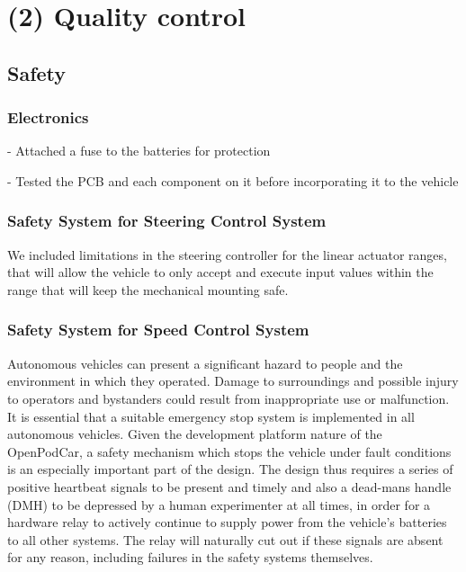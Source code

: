\documentclass[a4paper]{article}
\begin{document}
\section{(2) Quality control}\label{h.f8237gmzmwc6}

\subsection{Safety}\label{h.v60aduckfisj}


\subsubsection{Electronics}

- Attached a fuse to the batteries for protection

- Tested the PCB and each component on it before incorporating it to the vehicle


\subsubsection{Safety System for Steering Control System}

We included limitations in the steering controller for the linear actuator ranges, that will allow the vehicle to only accept and execute input values within the range that will keep the mechanical mounting safe.


\subsubsection{Safety System for Speed Control System}

Autonomous vehicles can present a significant hazard to people and the environment in which they operated. Damage to surroundings and possible injury to operators and bystanders could result from inappropriate use or malfunction. It is essential that a suitable emergency stop system is implemented in all autonomous vehicles.   Given the development platform nature of the OpenPodCar, a safety mechanism which stops the vehicle under fault conditions is an especially important part of the design.   The design thus requires a series of positive heartbeat signals to be present and timely and also a dead-mans handle (DMH) to be depressed by a human experimenter at all times, in order for a hardware relay to actively continue to supply power from the vehicle’s batteries to all other systems.  The relay will naturally cut out if these signals are absent for any reason, including failures in the safety systems themselves.
\end{document}
